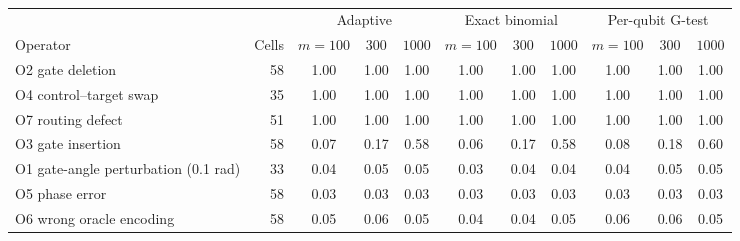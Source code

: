 \begin{table}[ht]
\centering
\caption{}
\label{tab:struct_marginal}
\small
\begin{tabular}{l r ccc ccc ccc}
\toprule
& & \multicolumn{3}{c}{Adaptive} & \multicolumn{3}{c}{Exact binomial} & \multicolumn{3}{c}{Per-qubit G-test} \\
\cmidrule(lr){3-5} \cmidrule(lr){6-8} \cmidrule(lr){9-11}
Operator & Cells & $m{=}100$ & $300$ & $1000$ & $m{=}100$ & $300$ & $1000$ & $m{=}100$ & $300$ & $1000$ \\
\midrule
O2 gate deletion & 58 & 1.00 & 1.00 & 1.00 & 1.00 & 1.00 & 1.00 & 1.00 & 1.00 & 1.00 \\
O4 control--target swap & 35 & 1.00 & 1.00 & 1.00 & 1.00 & 1.00 & 1.00 & 1.00 & 1.00 & 1.00 \\
O7 routing defect & 51 & 1.00 & 1.00 & 1.00 & 1.00 & 1.00 & 1.00 & 1.00 & 1.00 & 1.00 \\
O3 gate insertion & 58 & 0.07 & 0.17 & 0.58 & 0.06 & 0.17 & 0.58 & 0.08 & 0.18 & 0.60 \\
O1 gate-angle perturbation (0.1 rad) & 33 & 0.04 & 0.05 & 0.05 & 0.03 & 0.04 & 0.04 & 0.04 & 0.05 & 0.05 \\
O5 phase error & 58 & 0.03 & 0.03 & 0.03 & 0.03 & 0.03 & 0.03 & 0.03 & 0.03 & 0.03 \\
O6 wrong oracle encoding & 58 & 0.05 & 0.06 & 0.05 & 0.04 & 0.04 & 0.05 & 0.06 & 0.06 & 0.05 \\
\bottomrule
\end{tabular}
\end{table}
